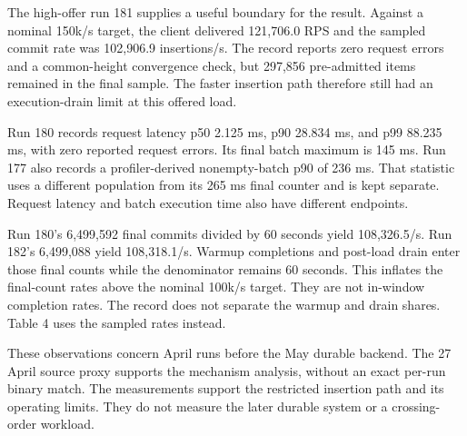 \documentclass[11pt]{article}
\begin{document}
The high-offer run 181 supplies a useful boundary for the result. Against a nominal 150k/s target, the client delivered 121,706.0 RPS and the sampled commit rate was 102,906.9 insertions/s. The record reports zero request errors and a common-height convergence check, but 297,856 pre-admitted items remained in the final sample. The faster insertion path therefore still had an execution-drain limit at this offered load. \cite{R13}

Run 180 records request latency p50 2.125 ms, p90 28.834 ms, and p99 88.235 ms, with zero reported request errors. Its final batch maximum is 145 ms. Run 177 also records a profiler-derived nonempty-batch p90 of 236 ms. That statistic uses a different population from its 265 ms final counter and is kept separate. Request latency and batch execution time also have different endpoints. \cite{R13}

Run 180's 6,499,592 final commits divided by 60 seconds yield 108,326.5/s. Run 182's 6,499,088 yield 108,318.1/s. Warmup completions and post-load drain enter those final counts while the denominator remains 60 seconds. This inflates the final-count rates above the nominal 100k/s target. They are not in-window completion rates. The record does not separate the warmup and drain shares. Table 4 uses the sampled rates instead. \cite{R13}

These observations concern April runs before the May durable backend. The 27 April source proxy supports the mechanism analysis, without an exact per-run binary match. The measurements support the restricted insertion path and its operating limits. They do not measure the later durable system or a crossing-order workload.
\end{document}
